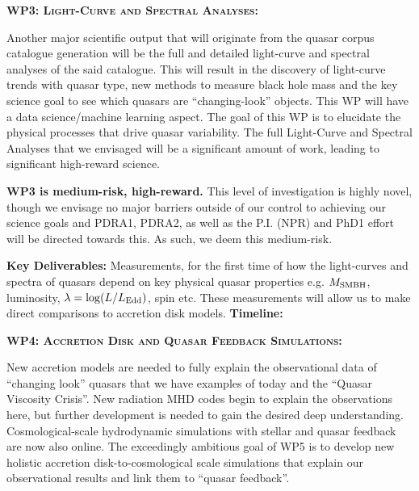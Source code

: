 \medskip 
\medskip
\smallskip
\smallskip
\noindent
\textbf{\textsc{WP3: Light-Curve and Spectral Analyses:}} 

\smallskip
\smallskip
\noindent
Another major scientific output that will originate from the quasar
corpus catalogue generation will be the full and detailed light-curve
and spectral analyses of the said catalogue. This will result in the
discovery of light-curve trends with quasar type, new methods to
measure black hole mass and the key science goal to see which quasars
are ``changing-look'' objects. This WP will have a data
science/machine learning aspect.  The goal of this WP is to elucidate
the physical processes that drive quasar variability.  The full
Light-Curve and Spectral Analyses that we envisaged will be a
significant amount of work, leading to significant high-reward
science.  

\smallskip
\smallskip
\noindent
{\bf WP3 is medium-risk, high-reward.}  
This level of investigation is highly novel, though we envisage no
major barriers outside of our control to achieving our science goals
and PDRA1, PDRA2, as well as the P.I. (NPR) and PhD1 effort will be
directed towards this.
As such, we deem this medium-risk. 

\smallskip
\smallskip
\noindent
 {\bf Key Deliverables:}
Measurements, for the first time of how the light-curves and spectra
of quasars depend on key physical quasar properties e.g. $M_{\rm
SMBH}$, luminosity, $\lambda = \log (L / L_{\rm Edd})$, spin etc.
These measurements will allow us to make direct comparisons to
accretion disk models.  {\bf Timeline:} 



\medskip 
\medskip
\smallskip
\smallskip
\noindent
\textbf{\textsc{WP4: Accretion Disk and Quasar Feedback Simulations:}} 

\smallskip
\smallskip
\noindent
New accretion models are needed to fully explain the observational
data of ``changing look'' quasars that we have examples of today and
the ``Quasar Viscosity Crisis''. New radiation MHD codes begin to
explain the observations here, but further development is needed to
gain the desired deep understanding. Cosmological-scale hydrodynamic
simulations with stellar and quasar feedback are now also online. The
exceedingly ambitious goal of WP5 is to develop new holistic accretion
disk-to-cosmological scale simulations that explain our observational
results and link them to ``quasar feedback''.  

